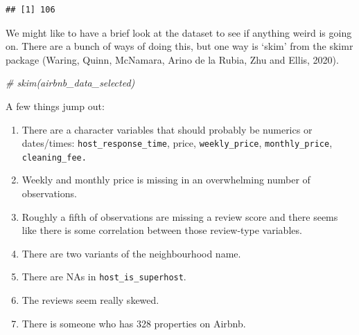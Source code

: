 \documentclass[
]{book}
\newenvironment{Shaded}{\begin{snugshade}}{\end{snugshade}}
\newcommand{\CommentTok}[1]{\textcolor[rgb]{0.56,0.35,0.01}{\textit{#1}}}
\newcommand{\KeywordTok}[1]{\textcolor[rgb]{0.13,0.29,0.53}{\textbf{#1}}}
\newcommand{\NormalTok}[1]{#1}
\newcommand{\OperatorTok}[1]{\textcolor[rgb]{0.81,0.36,0.00}{\textbf{#1}}}
\newcommand{\StringTok}[1]{\textcolor[rgb]{0.31,0.60,0.02}{#1}}
\providecommand{\tightlist}{%
  \setlength{\itemsep}{0pt}\setlength{\parskip}{0pt}}
\begin{document}
\begin{verbatim}
## [1] 106
\end{verbatim}

\begin{Shaded}
\end{Shaded}

We might like to have a brief look at the dataset to see if anything weird is going on. There are a bunch of ways of doing this, but one way is `skim' from the skimr package (Waring, Quinn, McNamara, Arino de la Rubia, Zhu and Ellis, 2020).

\begin{Shaded}
\begin{Highlighting}[]
\CommentTok{# skim(airbnb_data_selected)}
\end{Highlighting}
\end{Shaded}

A few things jump out:

\begin{enumerate}
\def\labelenumi{\arabic{enumi}.}
\tightlist
\item
  There are a character variables that should probably be numerics or dates/times: \texttt{host\_response\_time}, price, \texttt{weekly\_price}, \texttt{monthly\_price}, \texttt{cleaning\_fee.}
\item
  Weekly and monthly price is missing in an overwhelming number of observations.
\item
  Roughly a fifth of observations are missing a review score and there seems like there is some correlation between those review-type variables.
\item
  There are two variants of the neighbourhood name.
\item
  There are NAs in \texttt{host\_is\_superhost}.
\item
  The reviews seem really skewed.
\item
  There is someone who has 328 properties on Airbnb.
\end{enumerate}
\end{document}
